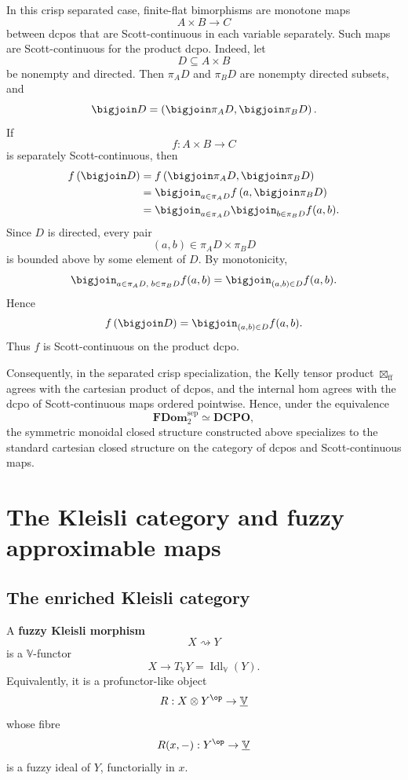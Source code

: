 In this crisp separated case, finite-flat bimorphisms are monotone maps
\[
    A\times B\to C
\]
between dcpos that are Scott-continuous in each variable separately.  Such maps
are Scott-continuous for the product dcpo.  Indeed, let
\[
    D\subseteq A\times B
\]
be nonempty and directed.  Then \(\pi_A D\) and \(\pi_BD\) are nonempty directed
subsets, and
\[
    \bigjoin D
    =
    \left(
        \bigjoin\pi_A D,
        \bigjoin\pi_BD
    \right).
\]
If
\[
    f:A\times B\to C
\]
is separately Scott-continuous, then
\[
\begin{aligned}
    f\left(\bigjoin D\right)
    &=
    f\left(
        \bigjoin\pi_A D,
        \bigjoin\pi_B D
    \right)
    \\
    &=
    \bigjoin_{a\in\pi_A D}
        f\left(a,\bigjoin\pi_BD\right)
    \\
    &=
    \bigjoin_{a\in\pi_A D}
        \bigjoin_{b\in\pi_BD}
            f(a,b).
\end{aligned}
\]
Since \(D\) is directed, every pair
\[
    (a,b)\in\pi_A D\times\pi_BD
\]
is bounded above by some element of \(D\).  By monotonicity,
\[
    \bigjoin_{a\in\pi_A D,\;b\in\pi_BD}f(a,b)
    =
    \bigjoin_{(a,b)\in D}f(a,b).
\]
Hence
\[
    f\left(\bigjoin D\right)
    =
    \bigjoin_{(a,b)\in D}f(a,b).
\]
Thus \(f\) is Scott-continuous on the product dcpo.

Consequently, in the separated crisp specialization, the Kelly tensor product
\(\boxtimes_{\mathrm{ff}}\) agrees with the cartesian product of dcpos, and the
internal hom agrees with the dcpo of Scott-continuous maps ordered pointwise.
Hence, under the equivalence
\[
    \mathbf{FDom}_{2}^{\mathrm{sep}}
    \simeq
    \mathbf{DCPO},
\]
the symmetric monoidal closed structure constructed above specializes to the
standard cartesian closed structure on the category of dcpos and Scott-continuous
maps.

\section{The Kleisli category and fuzzy approximable maps}
\label{sec:kleisli-fuzzy-ideal-monad}

\subsection{The enriched Kleisli category}
\label{subsec:kleisli-enriched}

\begin{definition}
\label{def:fuzzy-kleisli-morphism-enriched}
A \textbf{fuzzy Kleisli morphism}
\[
    X\rightsquigarrow Y
\]
is a \(\mathbb V\)-functor
\[
    X\to T_{\mathbb V}Y
    =
    \operatorname{Idl}_{\mathbb V}(Y).
\]
Equivalently, it is a profunctor-like object
\[
    R:X\otimes Y^{\op}\to\underline{\mathbb V}
\]
whose fibre
\[
    R(x,-):Y^{\op}\to\underline{\mathbb V}
\]
is a fuzzy ideal of \(Y\), functorially in \(x\).
\end{definition}

